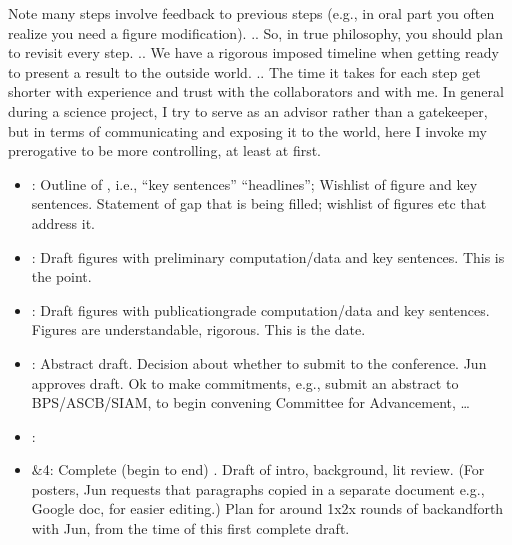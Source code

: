 \documentclass[letterpaper,10pt,english]{sphinxmanual}
\begin{document}
\sphinxAtStartPar
Note many steps involve feedback to previous steps (e.g., in oral part you often realize you need a figure modification).
.. So, in true {\hyperref[\detokenize{03CodersAtWork:codersatwork}]{}} philosophy, you should plan to revisit every step.
.. We have a rigorous imposed timeline when getting ready to present a result to the outside world.
.. The time it takes for each step get shorter with experience and trust with the collaborators and with me.
In general during a science project, I try to serve as an advisor rather than a gatekeeper, but in terms of communicating and exposing it to the world, here I invoke my prerogative to be more controlling, at least at first.
\begin{itemize}
\item {} 
: Outline of , i.e., “key sentences” “headlines”; Wishlist of figure and key sentences. Statement of gap that is being filled; wishlist of figures etc that address it.

\item {} 
: Draft figures with preliminary computation/data and key sentences. This is the  point.

\item {} 
: Draft figures with publication\sphinxhyphen{}grade computation/data and key sentences. Figures are understandable, rigorous. This is the  date.

\item {} 
: Abstract draft. Decision about whether to submit to the conference. Jun approves draft. Ok to make commitments, e.g., submit an abstract to BPS/ASCB/SIAM, to begin convening Committee for Advancement, …

\item {} 
: 

\item {} 
\&4: Complete (begin to end) . Draft of intro, background, lit review. (For posters, Jun requests that paragraphs copied in a separate document e.g., Google doc, for easier editing.) Plan for around 1x\sphinxhyphen{}2x rounds of back\sphinxhyphen{}and\sphinxhyphen{}forth with Jun, from the time of this first complete draft.


\end{itemize}
\end{document}
